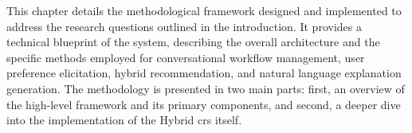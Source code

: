 This chapter details the methodological framework designed and implemented to address the research questions outlined in the introduction. It provides a technical blueprint of the system, describing the overall architecture and the specific methods employed for conversational workflow management, user preference elicitation, hybrid recommendation, and natural language explanation generation. The methodology is presented in two main parts: first, an overview of the high-level framework and its primary components, and second, a deeper dive into the implementation of the Hybrid \acl{crs} itself.